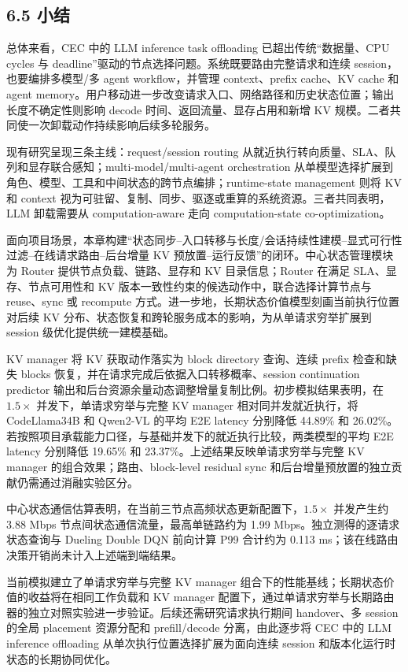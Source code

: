 \subsection*{6.5 小结}

总体来看，CEC 中的 LLM inference task offloading 已超出传统“数据量、CPU cycles 与 deadline”驱动的节点选择问题。系统既要路由完整请求和连续 session，也要编排多模型/多 agent workflow，并管理 context、prefix cache、KV cache 和 agent memory。用户移动进一步改变请求入口、网络路径和历史状态位置；输出长度不确定性则影响 decode 时间、返回流量、显存占用和新增 KV 规模。二者共同使一次卸载动作持续影响后续多轮服务。

现有研究呈现三条主线：request/session routing 从就近执行转向质量、SLA、队列和显存联合感知；multi-model/multi-agent orchestration 从单模型选择扩展到角色、模型、工具和中间状态的跨节点编排；runtime-state management 则将 KV 和 context 视为可驻留、复制、同步、驱逐或重算的系统资源。三者共同表明，LLM 卸载需要从 computation-aware 走向 computation-state co-optimization。

面向项目场景，本章构建“状态同步--入口转移与长度/会话持续性建模--显式可行性过滤--在线请求路由--后台增量 KV 预放置--运行反馈”的闭环。中心状态管理模块为 Router 提供节点负载、链路、显存和 KV 目录信息；Router 在满足 SLA、显存、节点可用性和 KV 版本一致性约束的候选动作中，联合选择计算节点与 reuse、sync 或 recompute 方式。进一步地，长期状态价值模型刻画当前执行位置对后续 KV 分布、状态恢复和跨轮服务成本的影响，为从单请求穷举扩展到 session 级优化提供统一建模基础。

KV manager 将 KV 获取动作落实为 block directory 查询、连续 prefix 检查和缺失 blocks 恢复，并在请求完成后依据入口转移概率、session continuation predictor 输出和后台资源余量动态调整增量复制比例。初步模拟结果表明，在 \(1.5\times\) 并发下，单请求穷举与完整 KV manager 相对同并发就近执行，将 CodeLlama34B 和 Qwen2-VL 的平均 E2E latency 分别降低 44.89\% 和 26.02\%。若按照项目承载能力口径，与基础并发下的就近执行比较，两类模型的平均 E2E latency 分别降低 19.65\% 和 23.37\%。上述结果反映单请求穷举与完整 KV manager 的组合效果；路由、block-level residual sync 和后台增量预放置的独立贡献仍需通过消融实验区分。

中心状态通信估算表明，在当前三节点高频状态更新配置下，\(1.5\times\) 并发产生约 3.88 Mbps 节点间状态通信流量，最高单链路约为 1.99 Mbps。独立测得的逐请求状态查询与 Dueling Double DQN 前向计算 P99 合计约为 0.113 ms；该在线路由决策开销尚未计入上述端到端结果。

当前模拟建立了单请求穷举与完整 KV manager 组合下的性能基线；长期状态价值的收益将在相同工作负载和 KV manager 配置下，通过单请求穷举与长期路由器的独立对照实验进一步验证。后续还需研究请求执行期间 handover、多 session 的全局 placement 资源分配和 prefill/decode 分离，由此逐步将 CEC 中的 LLM inference offloading 从单次执行位置选择扩展为面向连续 session 和版本化运行时状态的长期协同优化。
